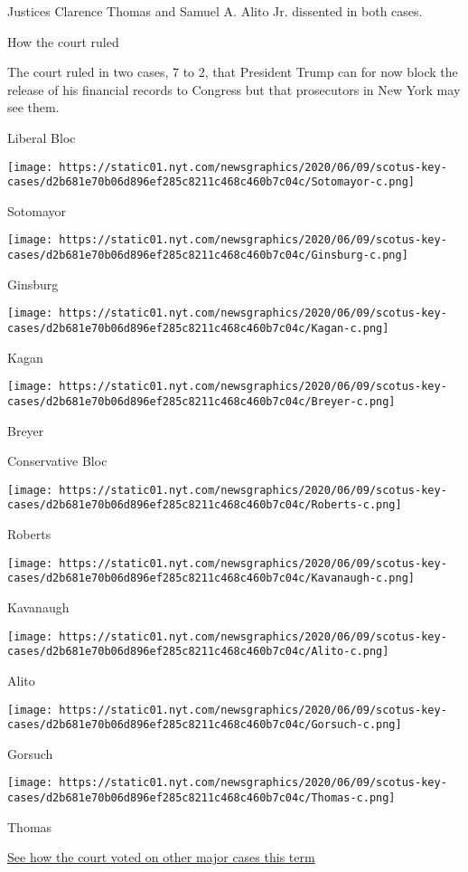 Justices Clarence Thomas and Samuel A. Alito Jr. dissented in both
cases.

How the court ruled

The court ruled in two cases, 7 to 2, that President Trump can for now
block the release of his financial records to Congress but that
prosecutors in New York may see them.

Liberal Bloc

\texttt{[image: https://static01.nyt.com/newsgraphics/2020/06/09/scotus-key-cases/d2b681e70b06d896ef285c8211c468c460b7c04c/Sotomayor-c.png]}

Sotomayor

\texttt{[image: https://static01.nyt.com/newsgraphics/2020/06/09/scotus-key-cases/d2b681e70b06d896ef285c8211c468c460b7c04c/Ginsburg-c.png]}

Ginsburg

\texttt{[image: https://static01.nyt.com/newsgraphics/2020/06/09/scotus-key-cases/d2b681e70b06d896ef285c8211c468c460b7c04c/Kagan-c.png]}

Kagan

\texttt{[image: https://static01.nyt.com/newsgraphics/2020/06/09/scotus-key-cases/d2b681e70b06d896ef285c8211c468c460b7c04c/Breyer-c.png]}

Breyer

Conservative Bloc

\texttt{[image: https://static01.nyt.com/newsgraphics/2020/06/09/scotus-key-cases/d2b681e70b06d896ef285c8211c468c460b7c04c/Roberts-c.png]}

Roberts

\texttt{[image: https://static01.nyt.com/newsgraphics/2020/06/09/scotus-key-cases/d2b681e70b06d896ef285c8211c468c460b7c04c/Kavanaugh-c.png]}

Kavanaugh

\texttt{[image: https://static01.nyt.com/newsgraphics/2020/06/09/scotus-key-cases/d2b681e70b06d896ef285c8211c468c460b7c04c/Alito-c.png]}

Alito

\texttt{[image: https://static01.nyt.com/newsgraphics/2020/06/09/scotus-key-cases/d2b681e70b06d896ef285c8211c468c460b7c04c/Gorsuch-c.png]}

Gorsuch

\texttt{[image: https://static01.nyt.com/newsgraphics/2020/06/09/scotus-key-cases/d2b681e70b06d896ef285c8211c468c460b7c04c/Thomas-c.png]}

Thomas

\href{https://www.nytimes.com/interactive/2020/06/15/us/supreme-court-major-cases-2020.html}{See
how the court voted on other major cases this term}

